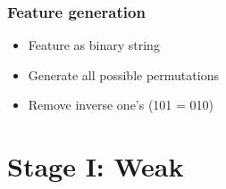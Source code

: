 \documentclass{beamer}
\begin{document}
\frame
{
	\begin{figure}[!ht]
		\centering
		\label{fig:feature}
	\end{figure}
}

\frame
{
  \frametitle{Feature generation}
	\begin{itemize}
		\item <+-| alert@+> Feature as binary string
		\item <+-| alert@+> Generate all possible permutations
		\item <+-| alert@+> Remove inverse one's (101 = 010)
	\end{itemize}
}

\section{Stage I: Weak}
\end{document}

